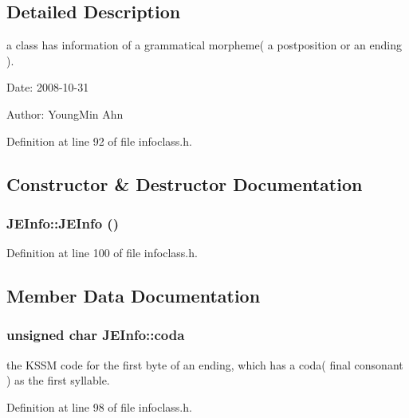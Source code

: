 \subsection{Detailed Description}
a class has information of a grammatical morpheme( a postposition or an ending ). 

\begin{Desc}
\item[Date:]2008-10-31 \end{Desc}
\begin{Desc}
\item[Author:]YoungMin Ahn \end{Desc}


Definition at line 92 of file infoclass.h.

\subsection{Constructor \& Destructor Documentation}
\hypertarget{classJEInfo_4479c606003581bbc47d1ef3cd3ab654}{
\subsubsection[{JEInfo}]{\setlength{\rightskip}{0pt plus 5cm}JEInfo::JEInfo ()}}
\label{classJEInfo_4479c606003581bbc47d1ef3cd3ab654}




Definition at line 100 of file infoclass.h.

\subsection{Member Data Documentation}
\hypertarget{classJEInfo_ce3fb759b740683f578ced18cb30db2d}{
\subsubsection[{coda}]{\setlength{\rightskip}{0pt plus 5cm}unsigned char {\bf JEInfo::coda}}}
\label{classJEInfo_ce3fb759b740683f578ced18cb30db2d}


the KSSM code for the first byte of an ending, which has a coda( final consonant ) as the first syllable. 



Definition at line 98 of file infoclass.h.

